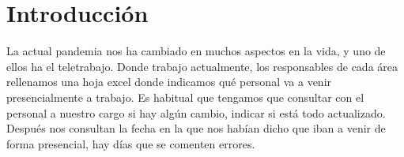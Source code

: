 \documentclass[11pt,spanish,listoffigures,listoftables]{tfgetsinf}
\begin{document}
\begin{abstract}[english]
Telework Shift Manager is a tool to organize shifts in which the personnel of the different departments of a company takes turns to telework.

For the basic client, a calendar is offered where you can confirm the shifts that are assigned to you or request a change from another colleague.

You also have visibility on the shifts in your area to be able to request the change.

You can also get a copy of the calendar in pdf to print it later or store it.

The department manager can obtain a report with graphs of the people he manages and obtain a list of dates and users working in person.

The application manager has an interface to be able to modify the application settings and obtain a list of dates and users working in person.

The application can be deployed in the google cloud, so it can be accessed from any location, without the need to invest in dedicated infrastructure.
\end{abstract}


\mainmatter


\chapter{Introducci\'on}
La actual pandemia nos ha cambiado en muchos aspectos en la vida, y uno de ellos ha el teletrabajo. Donde trabajo actualmente, los responsables de cada área rellenamos una hoja excel donde indicamos qué personal va a venir presencialmente a trabajo.
Es habitual que tengamos que consultar con el personal a nuestro cargo si hay algún cambio, indicar si está todo actualizado. Después nos consultan la fecha en la que nos habían dicho que iban a venir de forma presencial, hay días que se comenten errores. 
\end{document}
